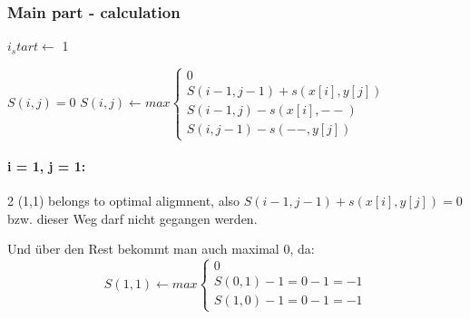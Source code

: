 \subsubsection*{Main part - calculation}
$i_start \gets $ 1
\begin{algorithmic}
                \State $S(i,j) = 0$
            \Else
                \State $S(i,j) \gets max \begin{cases}
                                             0   \\
                                             S(i - 1, j - 1) + s(x[i], y[j])  \\
                                             S(i - 1, j) - s(x[i], --)  \\
                                             S(i, j - 1) - s(--, y[j])
                \end{cases}$
            \EndIf
        \EndFor
    \EndFor
\end{algorithmic}
\paragraph{i = 1, j = 1:}
\begin{multicols}{2}
(1,1) belongs to optimal aligmnent, also $S(i - 1, j - 1) + s(x[i], y[j]) = 0$ bzw. dieser Weg darf nicht gegangen werden.

Und über den Rest bekommt man auch maximal 0, da:
\[
    S(1,1) \gets max \begin{cases}
                         0   \\
                         S(0, 1) - 1 = 0-1 = -1  \\
                         S(1, 0) - 1 = 0-1 = -1
    \end{cases}
\]
\end{multicols}

